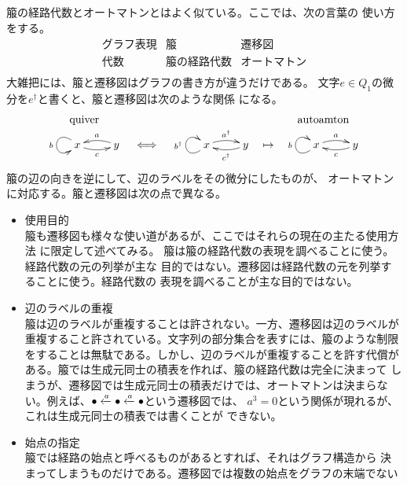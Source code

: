 {	箙の経路代数とオートマトンとはよく似ている。ここでは、次の言葉の
	使い方をする。
	\begin{equation}\begin{array}{l|ll}
		\text{グラフ表現} & \text{箙} & \text{遷移図} \\
		\text{代数} & \text{箙の経路代数} & \text{オートマトン} \\
	\end{array}\end{equation}
	大雑把には、箙と遷移図はグラフの書き方が違うだけである。
	文字$e\in Q_1$の{\brz}微分を$e^\dag$と書くと、箙と遷移図は次のような関係
	になる。
	\begin{equation*}\begin{array}{ccccc}
		\text{quiver} &\quad& &\quad& \text{autoamton} \\
		\xymatrix{
			x \ar@/_1ex/[r]_c \ar@(lu,ld)_b & y \ar@/_1ex/[l]_a
		} &\iff& \xymatrix{
			x \ar@/^1ex/[r]^{a^\dag} \ar@(ld,lu)^{b^\dag} 
			& y \ar@/^1ex/[l]^{c^\dag}
		} &\mapsto& \xymatrix{
			x \ar@/^1ex/[r]^{a} \ar@(ld,lu)^{b} & y \ar@/^1ex/[l]^{c}
		}
	\end{array}\end{equation*}
	箙の辺の向きを逆にして、辺のラベルをその{\brz}微分にしたものが、
	オートマトンに対応する。箙と遷移図は次の点で異なる。
	\begin{itemize}\setlength{\itemsep}{-1mm} %
		\item 使用目的 \\
		箙も遷移図も様々な使い道があるが、ここではそれらの現在の主たる使用方法
		に限定して述べてみる。
		箙は箙の経路代数の表現を調べることに使う。経路代数の元の列挙が主な
		目的ではない。遷移図は経路代数の元を列挙することに使う。経路代数の
		表現を調べることが主な目的ではない。
		\item 辺のラベルの重複 \\
		箙は辺のラベルが重複することは許されない。一方、遷移図は辺のラベルが
		重複すること許されている。文字列の部分集合を表すには、箙のような制限
		をすることは無駄である。しかし、辺のラベルが重複することを許す代償が
		ある。箙では生成元同士の積表を作れば、箙の経路代数は完全に決まって
		しまうが、遷移図では生成元同士の積表だけでは、オートマトンは決まらな
		い。例えば、$\bullet\xleftarrow[{}]{a}\bullet\xleftarrow[{}]{a}\bullet$という遷移図では、
		$a^3=0$という関係が現れるが、これは生成元同士の積表では書くことが
		できない。
		\item 始点の指定 \\
		箙では経路の始点と呼べるものがあるとすれば、それはグラフ構造から
		決まってしまうものだけである。遷移図では複数の始点をグラフの末端でない

\end{itemize}}
